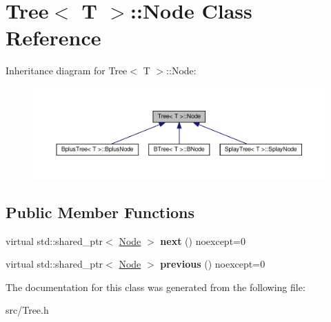 \hypertarget{classTree_1_1Node}{}\section{Tree$<$ T $>$\+:\+:Node Class Reference}
\label{classTree_1_1Node}


Inheritance diagram for Tree$<$ T $>$\+:\+:Node\+:
\nopagebreak
\begin{figure}[H]
\begin{center}
\leavevmode
\includegraphics[width=350pt]{classTree_1_1Node__inherit__graph}
\end{center}
\end{figure}
\subsection*{Public Member Functions}
\begin{DoxyCompactItemize}
\item 
\mbox{\label{classTree_1_1Node_a50f15b262b0d6c572904be68ba067ca6}} 
virtual std\+::shared\+\_\+ptr$<$ \hyperlink{classTree_1_1Node}{Node} $>$ {\bfseries next} () noexcept=0
\item 
\mbox{\label{classTree_1_1Node_a3f912d90adc2c50de5ce7f96e6695c96}} 
virtual std\+::shared\+\_\+ptr$<$ \hyperlink{classTree_1_1Node}{Node} $>$ {\bfseries previous} () noexcept=0
\end{DoxyCompactItemize}


The documentation for this class was generated from the following file\+:\begin{DoxyCompactItemize}
\item 
src/Tree.\+h\end{DoxyCompactItemize}
